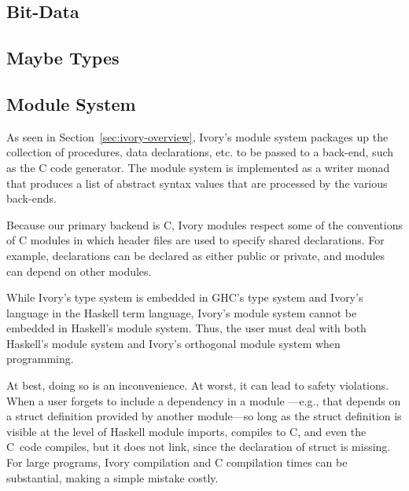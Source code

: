 \begin{code}
\end{code}

\subsection{Bit-Data}

\subsection{Maybe Types}

\subsection{Module System}

As seen in Section~\ref{sec:ivory-overview}, Ivory's module system packages up
the collection of procedures, data declarations, etc. to be passed to a
back-end, such as the C code generator. The module system is implemented as a
writer monad that produces a list of abstract syntax values that are processed
by the various back-ends.

Because our primary backend is C, Ivory modules respect some of the conventions
of C modules in which header files are used to specify shared declarations. For
example, declarations can be declared as either public or private, and modules
can depend on other modules.

While Ivory's type system is embedded in GHC's type system and Ivory's language
in the Haskell term language, Ivory's module system cannot be embedded in
Haskell's module system. Thus, the user must deal with both Haskell's module
system and Ivory's orthogonal module system when programming.

At best, doing so is an inconvenience. At worst, it can lead to safety
violations. When a user forgets to include a dependency in a module
---e.g., that  depends on a struct definition provided by
another module---so long as the struct definition is visible at the level of Haskell
module imports,  compiles to C, and even the C~code compiles, but it
does not link, since the declaration of struct is missing. For large programs,
Ivory compilation and C compilation times can be substantial, making a simple
mistake costly.

